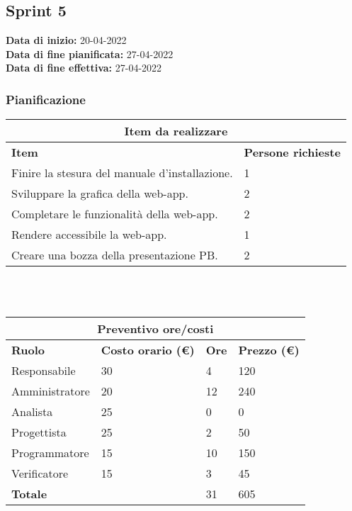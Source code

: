 \documentclass[a4paper, 12pt]{article}
\begin{document}
\subsection{Sprint 5}
\textbf{Data di inizio:} 20-04-2022\\
\textbf{Data di fine pianificata:} 27-04-2022\\
\textbf{Data di fine effettiva:} 27-04-2022

\subsubsection{Pianificazione}\mbox{}

\begin{center}
    \begin{tabularx}{\textwidth}{|X|X|}
        \hline
        \multicolumn{2}{|c|}{\textbf{Item da realizzare}}\\
        \hline
        \hline
        \textbf{Item} & \textbf{Persone richieste}\\
        \hline
        Finire la stesura del manuale d'installazione. & 1\\
        \hline
		Sviluppare la grafica della web-app. & 2 \\
		\hline
		Completare le funzionalità della web-app. & 2 \\
		\hline
		Rendere accessibile la web-app. & 1 \\
		\hline
		Creare una bozza della presentazione PB. & 2\\
		\hline
    \end{tabularx}\\[8pt]
    \mbox{}\\
\end{center}

\begin{center}
    \begin{tabularx}{\textwidth}{|X|X|X|X|}
        \hline
        \multicolumn{4}{|c|}{\textbf{Preventivo ore/costi}}\\
        \hline
        \hline
        \textbf{Ruolo} & \textbf{Costo orario (\euro)} & \textbf{Ore} & \textbf{Prezzo (\euro)}\\
        \hline
        Responsabile    & 30 & 4  & 120\\
        \hline
        Amministratore  & 20 & 12  & 240\\
        \hline
        Analista        & 25 & 0  & 0\\
        \hline
        Progettista     & 25 & 2  & 50\\
        \hline
        Programmatore   & 15 & 10  & 150\\
        \hline
        Verificatore    & 15 & 3  & 45\\
        \hline
        \hline
        \textbf{Totale} &    & 31 & 605\\
        \hline
    \end{tabularx}\\[8pt]
    \mbox{}\\
\end{center}
\end{document}
